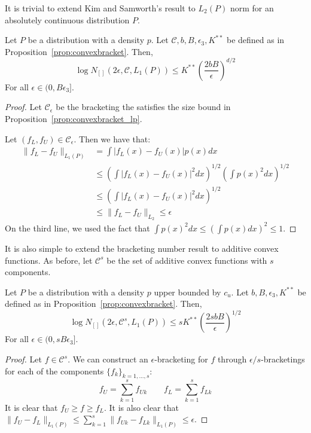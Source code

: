 It is trivial to extend Kim and Samworth's result to $L_2(P)$ norm for an absolutely continuous distribution $P$.

\begin{proposition}
\label{prop:convexbracket_lp}
Let $P$ be a distribution with a density $p$. Let $\mathcal{C}, b, B, \epsilon_3, K^{**}$ be defined as in Proposition~\ref{prop:convexbracket}. Then,
\[
\log N_{[]} (2\epsilon, \mathcal{C}, L_1(P)) \leq K^{**} \left( \frac{2bB}{\epsilon} \right)^{d/2}
\]
For all $\epsilon \in (0, B\epsilon_3]$.
\end{proposition}

\begin{proof}
Let $\mathcal{C}_\epsilon$ be the bracketing the satisfies the size bound in Proposition~\ref{prop:convexbracket_lp}. 

Let $(f_L, f_U) \in \mathcal{C}_\epsilon$. Then we have that:
\begin{align*}
\| f_L - f_U \|_{L_1(P)} &= \int | f_L(x) - f_U(x)| p(x) dx \\
   &\leq \left( \int | f_L(x) - f_U(x) |^2 dx \right)^{1/2}
      \left( \int p(x)^2 dx \right)^{1/2} \\
  &\leq \left( \int | f_L(x) - f_U(x)|^2 dx \right)^{1/2}\\
 &\leq \| f_L - f_U \|_{L_2} \leq \epsilon
\end{align*}
On the third line, we used the fact that $\int p(x)^2 dx \leq \left( \int p(x) dx \right)^2 \leq 1$.
\end{proof}

It is also simple to extend the bracketing number result to additive convex functions. As before, let $\mathcal{C}^s$ be the set of additive convex functions with $s$ components.

\begin{corollary}
\label{cor:convexadditive_lp}
Let $P$ be a distribution with a density $p$ upper bounded by $c_u$. Let $b, B, \epsilon_3, K^{**}$ be defined as in Proposition~\ref{prop:convexbracket}. Then,
\[
\log N_{[]}(2\epsilon, \mathcal{C}^s, L_1(P)) \leq s K^{**} 
    \left( \frac{2sbB}{\epsilon} \right)^{1/2}
\]
For all $\epsilon \in (0, s B \epsilon_3]$.
\end{corollary}

\begin{proof}
Let $f \in \mathcal{C}^s$. We can construct an $\epsilon$-bracketing for $f$ through $\epsilon/s$-bracketings for each of the components $\{ f_k \}_{k=1,...,s}$:
\[f_U = \sum_{k=1}^s f_{Uk}  \qquad f_L = \sum_{k=1}^s f_{Lk} \]
It is clear that $f_U \geq f \geq f_L$. It is also clear that $\| f_U - f_L \|_{L_1(P)} \leq \sum_{k=1}^s \| f_{Uk} - f_{Lk} \|_{L_1(P)} \leq \epsilon$.
\end{proof}


